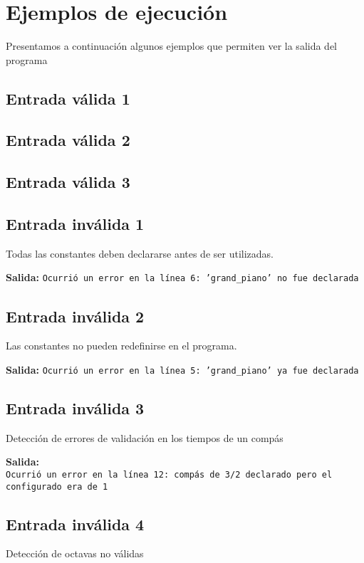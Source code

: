 \documentclass[a4paper,8pt]{article}
\begin{document}
\section{Ejemplos de ejecución}
Presentamos a continuación algunos ejemplos que permiten ver la salida del programa
\subsection{Entrada válida 1}
\subsection{Entrada válida 2}
\subsection{Entrada válida 3}
\subsection{Entrada inválida 1}
Todas las constantes deben declararse antes de ser utilizadas.
\begin{small}
  
\end{small}

\textbf{Salida:} \texttt{Ocurrió un error en la línea 6: 'grand\_piano' no fue declarada}


\subsection{Entrada inválida 2}
Las constantes no pueden redefinirse en el programa.
\begin{small}
  
\end{small}

\textbf{Salida:} \texttt{Ocurrió un error en la línea 5: 'grand\_piano' ya fue declarada}

\subsection{Entrada inválida 3}
Detección de errores de validación en los tiempos de un compás
\begin{small}
  
\end{small}

\textbf{Salida:}\\ \texttt{Ocurrió un error en la línea 12: compás de 3/2 declarado pero el configurado era de 1}
\subsection{Entrada inválida 4}
Detección de octavas no válidas
\begin{small}
  
\end{small}
\end{document}
